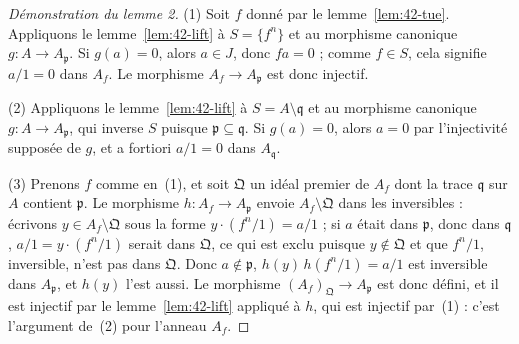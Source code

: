 \begin{proof}[Démonstration du lemme 2]
(1) Soit $f$ donné par le lemme~\ref{lem:42-tue}. Appliquons le lemme~\ref{lem:42-lift} à $S = \{f^n\}$ et au morphisme canonique $g : A \to A_{\mathfrak p}$. Si $g(a) = 0$, alors $a \in J$, donc $fa = 0$ ; comme $f \in S$, cela signifie $a/1 = 0$ dans $A_f$. Le morphisme $A_f \to A_{\mathfrak p}$ est donc injectif.

(2) Appliquons le lemme~\ref{lem:42-lift} à $S = A \setminus \mathfrak q$ et au morphisme canonique $g : A \to A_{\mathfrak p}$, qui inverse $S$ puisque $\mathfrak p \subseteq \mathfrak q$. Si $g(a) = 0$, alors $a = 0$ par l'injectivité supposée de $g$, et a fortiori $a/1 = 0$ dans $A_{\mathfrak q}$.

(3) Prenons $f$ comme en~(1), et soit $\mathfrak Q$ un idéal premier de $A_f$ dont la trace $\mathfrak q$ sur $A$ contient $\mathfrak p$. Le morphisme $h : A_f \to A_{\mathfrak p}$ envoie $A_f \setminus \mathfrak Q$ dans les inversibles : écrivons $y \in A_f \setminus \mathfrak Q$ sous la forme $y \cdot (f^n/1) = a/1$ ; si $a$ était dans $\mathfrak p$, donc dans $\mathfrak q$, $a/1 = y \cdot (f^n/1)$ serait dans $\mathfrak Q$, ce qui est exclu puisque $y \notin \mathfrak Q$ et que $f^n/1$, inversible, n'est pas dans $\mathfrak Q$. Donc $a \notin \mathfrak p$, $h(y)\,h(f^n/1) = a/1$ est inversible dans $A_{\mathfrak p}$, et $h(y)$ l'est aussi. Le morphisme $(A_f)_{\mathfrak Q} \to A_{\mathfrak p}$ est donc défini, et il est injectif par le lemme~\ref{lem:42-lift} appliqué à $h$, qui est injectif par~(1) : c'est l'argument de~(2) pour l'anneau $A_f$.
\end{proof}


